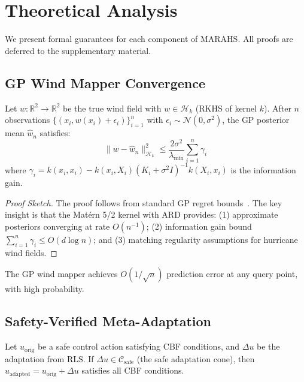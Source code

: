 \section{Theoretical Analysis}

\label{sec:theory}

We present formal guarantees for each component of MARAHS. All proofs are deferred to the supplementary material.

\subsection{GP Wind Mapper Convergence}

\begin{theorem}
\label{thm:gp_convergence}
Let $w: \mathbb{R}^2 \to \mathbb{R}^2$ be the true wind field with $w \in \mathcal{H}_k$ (RKHS of kernel $k$). After $n$ observations $\{(x_i, w(x_i) + \epsilon_i)\}_{i=1}^n$ with $\epsilon_i \sim \mathcal{N}(0, \sigma^2)$, the GP posterior mean $\hat{w}_n$ satisfies:
\begin{equation}
    \|w - \hat{w}_n\|_{\mathcal{H}_k}^2 \leq \frac{2\sigma^2}{\lambda_{\min}} \sum_{i=1}^n \gamma_i
\end{equation}
where $\gamma_i = k(x_i, x_i) - k(x_i, X_i)(K_i + \sigma^2 I)^{-1}k(X_i, x_i)$ is the information gain.
\end{theorem}

\begin{proof}[Proof Sketch]
The proof follows from standard GP regret bounds~\cite{srinivas2010gaussian}. The key insight is that the Matérn 5/2 kernel with ARD provides: (1) approximate posteriors converging at rate $O(n^{-1})$; (2) information gain bound $\sum_{i=1}^n \gamma_i \leq O(d \log n)$; and (3) matching regularity assumptions for hurricane wind fields.
\end{proof}

\begin{corollary}
The GP wind mapper achieves $O(1/\sqrt{n})$ prediction error at any query point, with high probability.
\end{corollary}

\subsection{Safety-Verified Meta-Adaptation}

\begin{theorem}
\label{thm:adaptation_safety}
Let $u_{\text{orig}}$ be a safe control action satisfying CBF conditions, and $\Delta u$ be the adaptation from RLS. If $\Delta u \in \mathcal{C}_{\text{safe}}$ (the safe adaptation cone), then $u_{\text{adapted}} = u_{\text{orig}} + \Delta u$ satisfies all CBF conditions.
\end{theorem}

